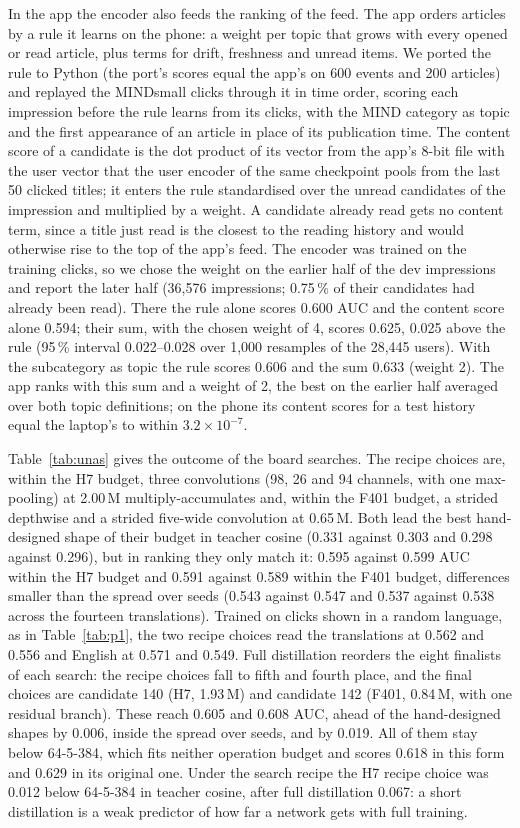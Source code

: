 \documentclass{llncs}
\begin{document}
In the app the encoder also feeds the ranking of the feed. The app orders
articles by a rule it learns on the phone: a weight per topic that grows with
every opened or read article, plus terms for drift, freshness and unread items.
We ported the rule to Python (the port's scores equal the app's on 600 events
and 200 articles) and replayed the MINDsmall clicks through it in time order,
scoring each impression before the rule learns from its clicks, with the MIND
category as topic and the first appearance of an article in place of its
publication time. The content score of a candidate is the dot product of its
vector from the app's 8-bit file with the user vector that the user encoder of
the same checkpoint pools from the last 50 clicked titles; it enters the rule
standardised over the unread candidates of the impression and multiplied by a
weight. A candidate already read gets no content term, since a title just read
is the closest to the reading history and would otherwise rise to the top of the
app's feed. The encoder was trained on the training clicks, so we chose the
weight on the earlier half of the dev impressions and report the later half
(36,576 impressions; 0.75\,\% of their candidates had already been read). There the
rule alone scores 0.600 AUC and the content score alone 0.594; their sum, with
the chosen weight of 4, scores 0.625, 0.025 above the rule (95\,\% interval
0.022--0.028 over 1,000 resamples of the 28,445 users). With the subcategory as
topic the rule scores 0.606 and the sum 0.633 (weight 2). The app ranks with
this sum and a weight of 2, the best on the earlier half averaged over both
topic definitions; on the phone its content scores for a test history equal the
laptop's to within $3.2\times10^{-7}$.


Table~\ref{tab:unas} gives the outcome of the board searches. The recipe choices
are, within the H7 budget, three convolutions (98, 26 and 94 channels, with one
max-pooling) at 2.00\,M multiply-accumulates and, within the F401 budget, a
strided depthwise and a strided five-wide convolution at 0.65\,M. Both lead the
best hand-designed shape of their budget in teacher cosine (0.331 against 0.303
and 0.298 against 0.296), but in ranking they only match it: 0.595 against 0.599
AUC within the H7 budget and 0.591 against 0.589 within the F401 budget,
differences smaller than the spread over seeds (0.543 against 0.547 and 0.537
against 0.538 across the fourteen translations). Trained on clicks shown in a
random language, as in Table~\ref{tab:p1}, the two recipe choices read the
translations at 0.562 and 0.556 and English at 0.571 and 0.549. Full
distillation reorders the eight finalists of each search: the recipe choices fall
to fifth and fourth place, and the final choices are candidate 140 (H7, 1.93\,M)
and candidate 142 (F401, 0.84\,M, with one residual branch). These reach 0.605
and 0.608 AUC, ahead of the hand-designed shapes by 0.006, inside the spread over
seeds, and by 0.019. All of them stay below 64-5-384, which fits neither
operation budget and scores 0.618 in this form and 0.629 in its original one.
Under the search recipe the H7 recipe choice was 0.012 below 64-5-384 in teacher
cosine, after full distillation 0.067: a short distillation is a weak predictor
of how far a network gets with full training.
\end{document}
